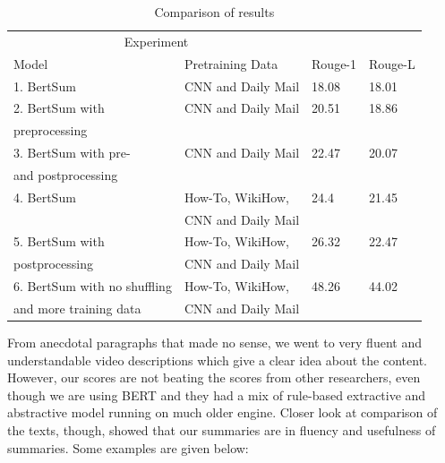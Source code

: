 \documentclass{article}
\begin{document}
\begin{table}[H]
  \caption{Comparison of results}
  \label{table1}
  \centering
  \begin{tabular}{llll}
    \toprule
    \multicolumn{2}{c}{Experiment}                   \\
    \cmidrule(r){1-2}
    Model     & Pretraining Data     & Rouge-1 &Rouge-L\\
    \midrule
   1. BertSum  & CNN  and Daily Mail &18.08 &18.01    \\
 \midrule   
    2. BertSum with  & CNN  and Daily Mail & 20.51 &18.86     \\
      preprocessing    & & \\
\midrule
    3. BertSum with pre-     & CNN  and Daily Mail  & 22.47&20.07  \\
      and postprocessing    & & \\
\midrule
  4. BertSum  & How-To, WikiHow,   & 24.4 &21.45     \\
& CNN  and Daily Mail&\\
\midrule
  5. BertSum with  & How-To, WikiHow, & 26.32 &22.47    \\
postprocessing &CNN  and Daily Mail &\\
\midrule
 6. BertSum with  no shuffling& How-To, WikiHow, & 48.26 &44.02    \\
and more training data &CNN  and Daily Mail &\\
     \bottomrule
  \end{tabular}
\end{table}


From anecdotal paragraphs that made no sense, we went to very fluent and understandable video descriptions which give a clear idea about the content. However, our scores are not beating the scores from other researchers, even though we are using BERT and they had a mix of rule-based extractive and abstractive model running on much older engine. Closer look at comparison of the texts, though, showed that our summaries are in fluency and usefulness of summaries. Some examples are given below:
\end{document}
